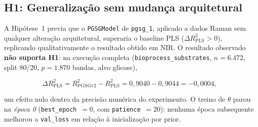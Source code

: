 %
%

\subsection{H1: Generalização sem mudança arquitetural}
\label{sec:results-h1}

A Hipótese~1 previa que o \texttt{PGSGModel} de \texttt{pgsg\_1}, aplicado a dados Raman sem qualquer alteração arquitetural, superaria o baseline PLS ($\Delta R^2_{\text{PLS}} > 0$), replicando qualitativamente o resultado obtido em NIR. O resultado observado \textbf{não suporta H1}: na execução completa (\texttt{bioprocess\_substrates}, $n=6.472$, split 80/20, $p=1.870$ bandas, alvo glicose),

\[
\Delta R^2_{\text{PLS}} = R^2_{\text{PGSGv2}} - R^2_{\text{PLS}} = 0{,}9040 - 0{,}9044 = -0{,}0004,
\]

um efeito nulo dentro da precisão numérica do experimento. O treino de $\theta$ parou na \emph{época 0} (\texttt{best\_epoch}~$=0$, com \texttt{patience}~$=20$): nenhuma época subsequente melhorou a \texttt{val\_loss} em relação à inicialização por prior.

